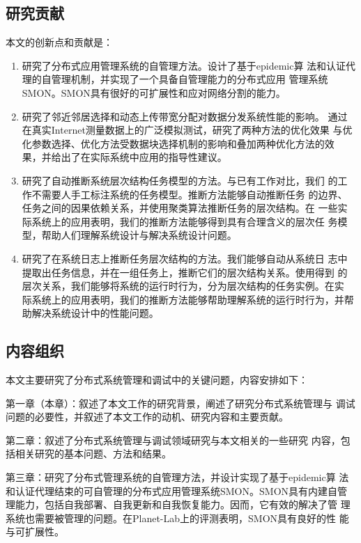 \subsection{研究贡献}

本文的创新点和贡献是：

\begin{enumerate}

  \item 研究了分布式应用管理系统的自管理方法。设计了基于epidemic算
  法和认证代理的自管理机制，并实现了一个具备自管理能力的分布式应用
  管理系统SMON。SMON具有很好的可扩展性和应对网络分割的能力。

  \item 研究了邻近邻居选择和动态上传带宽分配对数据分发系统性能的影响。
  通过在真实Internet测量数据上的广泛模拟测试，研究了两种方法的优化效果
  与优化参数选择、优化方法受数据块选择机制的影响和叠加两种优化方法的效
  果，并给出了在实际系统中应用的指导性建议。

  \item 研究了自动推断系统层次结构任务模型的方法。与已有工作对比，我们
  的工作不需要人手工标注系统的任务模型。推断方法能够自动推断任务
  的边界、任务之间的因果依赖关系，并使用聚类算法推断任务的层次结构。在
  一些实际系统上的应用表明，我们的推断方法能够得到具有合理含义的层次任
  务模型，帮助人们理解系统设计与解决系统设计问题。

  \item 研究了在系统日志上推断任务层次结构的方法。我们能够自动从系统日
  志中提取出任务信息，并在一组任务上，推断它们的层次结构关系。使用得到
  的层次关系，我们能够将系统的运行时行为，分为层次结构的任务实例。在实
  际系统上的应用表明，我们的推断方法能够帮助理解系统的运行时行为，并帮
  助解决系统设计中的性能问题。

\end{enumerate}

\subsection{内容组织}

本文主要研究了分布式系统管理和调试中的关键问题，内容安排如下：

  第一章（本章）：叙述了本文工作的研究背景，阐述了研究分布式系统管理与
  调试问题的必要性，并叙述了本文工作的动机、研究内容和主要贡献。

  第二章：叙述了分布式系统管理与调试领域研究与本文相关的一些研究
  内容，包括相关研究的基本问题、方法和结果。

  第三章：研究了分布式管理系统的自管理方法，并设计实现了基于epidemic算
  法和认证代理结束的可自管理的分布式应用管理系统SMON。SMON具有内建自管
  理能力，包括自我部署、自我更新和自我恢复能力。因而，它有效的解决了管
  理系统也需要被管理的问题。在Planet-Lab上的评测表明，SMON具有良好的性
  能与可扩展性。

